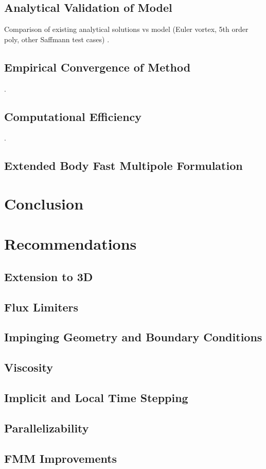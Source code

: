 \documentclass[letterpaper,12pt]{report}
\begin{document}
\section{Analytical Validation of Model}
Comparison of existing analytical solutions vs model (Euler vortex, 5th order poly, other Saffmann test cases)
\newpage.
\newpage
\section{Empirical Convergence of Method}
\newpage.
\newpage
\section{Computational Efficiency}
\newpage.
\newpage
\section{Extended Body Fast Multipole Formulation}
\chapter{Conclusion}
\chapter{Recommendations}
\section{Extension to 3D}
\section{Flux Limiters}
\section{Impinging Geometry and Boundary Conditions}
\section{Viscosity}
\newpage
\section{Implicit and Local Time Stepping}
\section{Parallelizability}
\section{FMM Improvements}
\end{document}
